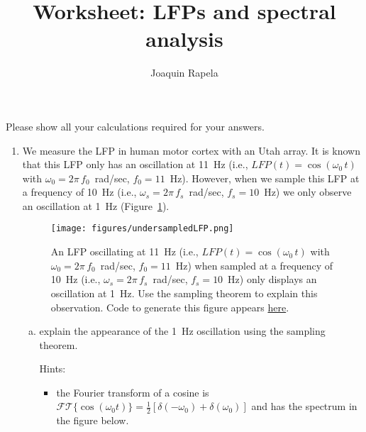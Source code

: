 \documentclass[12pt]{article}
\title{Worksheet: LFPs and spectral analysis}
\author{Joaquin Rapela}
\begin{document}
\maketitle

Please show all your calculations required for your answers.

\begin{enumerate}

    \item We measure the LFP in human motor cortex with an Utah array. It is
        known that this LFP only has an oscillation at 11~Hz (i.e.,
        $LFP(t)=\cos(\omega_0\,t)$ with $\omega_0=2\pi\,f_0$~rad/sec,
        $f_0=11$~Hz). However, when we sample this LFP at a frequency of 10~Hz
        (i.e., $\omega_s=2\pi\,f_s$~rad/sec, $f_s=10$~Hz) we only observe an
        oscillation at 1~Hz (Figure~\ref{fig:undersampledLFP}).

        \begin{figure}
            \begin{center}
                \texttt{[image: figures/undersampledLFP.png]}

                \caption{An LFP oscillating at 11~Hz (i.e., $LFP(t)=\cos(\omega_0\,t)$ with $\omega_0=2\pi\,f_0$~rad/sec,
                $f_0=11$~Hz) when sampled at a frequency of 10~Hz (i.e.,
                $\omega_s=2\pi\,f_s$~rad/sec, $f_s=10$~Hz) only displays an
                oscillation at 1~Hz. Use the sampling theorem to explain this
                observation.  Code to generate this figure appears
                \href{https://github.com/joacorapela/neuroinformatics24/blob/master/worksheets/02_LFPs_spectralAnalysis/code/doExUndersampledLFP.py}{here}.}

            \end{center}
            \label{fig:undersampledLFP}
        \end{figure}

        \begin{enumerate}[(a)]

            \item explain the appearance of the 1~Hz oscillation using the
                sampling theorem.

                Hints:

                \begin{itemize}

                    \item the Fourier transform of a cosine is
                        $\mathcal{FT}\{\cos(\omega_0
                        t)\}=\frac{1}{2}[\delta(-\omega_0)+\delta(\omega_0)]$
                        and has the spectrum in the figure below.
                        


\end{itemize}
\end{enumerate}
\end{enumerate}
\end{document}
